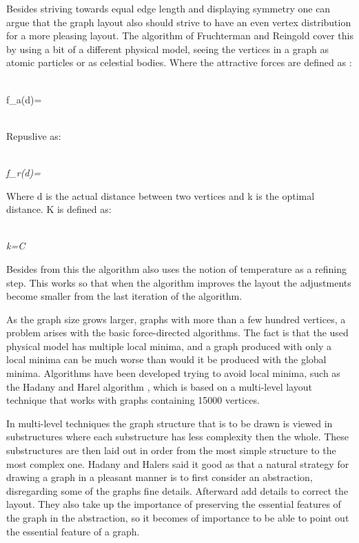 \documentclass[a4paper,11pt]{kth-mag}
\begin{document}
Besides striving towards equal edge length and displaying symmetry one can argue that the graph layout also should strive to have an even vertex distribution for a more pleasing layout. The algorithm of Fruchterman and Reingold
cover this by using a bit of a different physical model, seeing the vertices in a graph as atomic particles or as celestial bodies. Where the attractive forces are defined as \cite{1338}:\\
\begin{mathsurround}
\\
\math f_{a}(d)=\\
\\
\end{mathsurround}
 Repuslive as:\\
\begin{mathsurround}
\\
\emph{\math f_{r}(d)=}
\\
\end{mathsurround}
Where d is the actual distance between two vertices and k is the optimal distance. K is defined as:\\
\begin{mathsurround}
\\
\emph{\math k=C}
\\
\end{mathsurround}

Besides from this the algorithm also uses the notion of temperature as a refining step. This works so that when the algorithm improves the layout the adjustments become smaller from the last iteration of the algorithm.
 
As the graph size grows larger, graphs with more than a few hundred vertices, a problem arises with the basic force-directed algorithms. The fact is that the used physical model has multiple local minima, and a graph produced
with only a local minima can be much worse than would it be produced with the global minima. Algorithms have been developed trying to avoid local minima, such as the Hadany and Harel algorithm \cite{handh}, which is based on
a multi-level layout technique that works with graphs containing 15000 vertices. 

In multi-level techniques the graph structure that is to be drawn is viewed in substructures where each substructure has less complexity then the whole. These substructures are then laid out in order from the most simple 
structure to the most complex one. Hadany and Halers \cite{handh} said it good as that a natural strategy for drawing a graph in a pleasant manner is to first consider an abstraction, 
disregarding some of the graphs fine details. Afterward add details to correct the layout. They also take up the importance of preserving the essential features of the graph in the abstraction,
so it becomes of importance to be able to point out the essential feature of a graph. 
\end{document}
